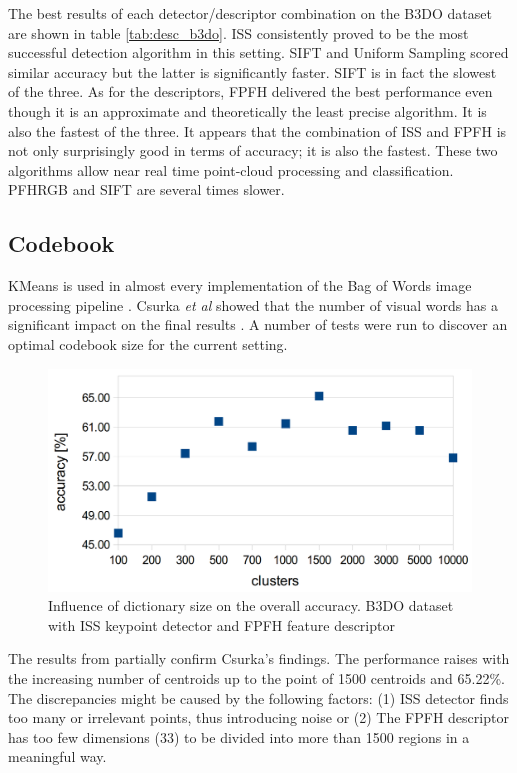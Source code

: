 \documentclass[11pt,twoside]{article}
\begin{document}
    The best results of each detector/descriptor combination on the B3DO dataset are shown in table \ref{tab:desc_b3do}. ISS consistently proved to be the most successful detection algorithm in this setting. SIFT and Uniform Sampling scored similar accuracy but the latter is significantly faster. SIFT is in fact the slowest of the three. As for the descriptors, FPFH delivered the best performance even though it is an approximate and theoretically the least precise algorithm. It is also the fastest of the three. It appears that the combination of ISS and FPFH is not only surprisingly good in terms of accuracy; it is also the fastest. These two algorithms allow near real time point-cloud processing and classification. PFHRGB and SIFT are several times slower.
      
  \subsection{Codebook}
    KMeans is used in almost every implementation of the Bag of Words image processing pipeline \cite{tsai2012bag, toldo2009bag}. Csurka \emph{et al} showed that the number of visual words has a significant impact on the final results \cite{csurka2004visual}. A number of tests were run to discover an optimal codebook size for the current setting.

    \begin{figure}[!ht]
    \centering	
    \includegraphics[width=.75\textwidth]{../figs/clustering_centroids_b3do}
    \caption{Influence of dictionary size on the overall accuracy. B3DO dataset with ISS keypoint detector and FPFH feature descriptor}
    \label{fig:cluster_b3do}
    \end{figure}

    The results from  partially confirm Csurka's findings. The performance raises with the increasing number of centroids up to the point of 1500 centroids and 65.22\%. The discrepancies might be caused by the following factors: (1) ISS detector finds too many or irrelevant points, thus introducing noise or (2) The FPFH descriptor has too few dimensions (33) to be divided into more than 1500 regions in a meaningful way. 
\end{document}
